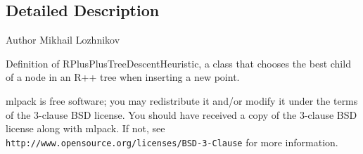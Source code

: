 \subsection{Detailed Description}
\begin{DoxyAuthor}{Author}
Mikhail Lozhnikov
\end{DoxyAuthor}
Definition of R\+Plus\+Plus\+Tree\+Descent\+Heuristic, a class that chooses the best child of a node in an R++ tree when inserting a new point.

mlpack is free software; you may redistribute it and/or modify it under the terms of the 3-\/clause B\+SD license. You should have received a copy of the 3-\/clause B\+SD license along with mlpack. If not, see {\tt http\+://www.\+opensource.\+org/licenses/\+B\+S\+D-\/3-\/\+Clause} for more information. 